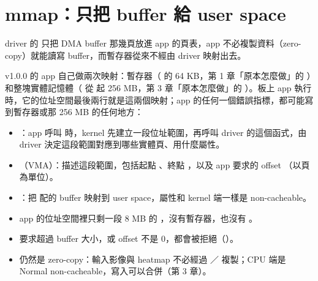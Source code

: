 \section{mmap：只把 buffer 給 user space}
\label{sec:mmap}

\begin{oneline}
driver 的  只把 DMA buffer 那幾頁放進 app 的頁表，app 不必複製資料（zero-copy）就能讀寫 buffer，而暫存器從來不經由 driver 映射出去。
\end{oneline}

\begin{before}
v1.0.0 的 app 自己做兩次映射：暫存器（ 的 64 KB，第 1 章「原本怎麼做」的 ）和整塊實體記憶體（ 從  起 256 MB，第 3 章「原本怎麼做」的 ）。板上 app 執行時，它的位址空間最後兩行就是這兩個映射；app 的任何一個錯誤指標，都可能寫到暫存器或那 256 MB 的任何地方：

\end{before}

\begin{tech}
\begin{itemize}
\item {}：app 呼叫  時，kernel 先建立一段位址範圍，再呼叫 driver 的這個函式，由 driver 決定這段範圍對應到哪些實體頁、用什麼屬性。
\item {}（VMA）：描述這段範圍，包括起點 、終點 ，以及 app 要求的 offset （以頁為單位）。
\item {}：把  配的 buffer 映射到 user space，屬性和 kernel 端一樣是 non-cacheable。
\end{itemize}
\end{tech}

\begin{gain}
\begin{itemize}
\item app 的位址空間裡只剩一段 8 MB 的 ，沒有暫存器，也沒有 。
\item 要求超過 buffer 大小，或 offset 不是 0，都會被拒絕（）。
\item 仍然是 zero-copy：輸入影像與 heatmap 不必經過 ／ 複製；CPU 端是 Normal non-cacheable，寫入可以合併（第 3 章）。
\end{itemize}
\end{gain}

